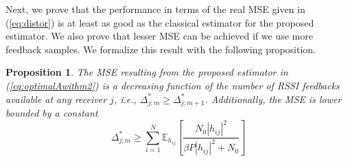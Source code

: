 \documentclass[francais]{gretsi}
\newtheorem{proposition}[theorem]{Proposition}
\begin{document}
Next, we prove that the performance in terms of the real MSE given in (\ref{eq:distor}) is at least as good as the classical estimator for the proposed estimator. We also prove that lesser MSE can be achieved if we use more feedback samples. We formalize this result with the following proposition.

\begin{proposition}
The MSE resulting from the proposed estimator in (\ref{eq:optimalAwithm2}) is a decreasing function of the number of RSSI feedbacks available at any receiver $j$, i.e., $\Delta^*_{j;m} \geq \Delta^*_{j;m+1}$. Additionally, the MSE is lower bounded by a constant
\begin{equation}
\Delta^*_{j;m} \geq \sum_{i=1}^N \mathbb{E}_{h_{ij}}\left[\frac{N_0|h_{ij}|^2}{\beta P|h_{ij}|^2+N_0}\right]
\end{equation}
\end{proposition}

\end{document}
